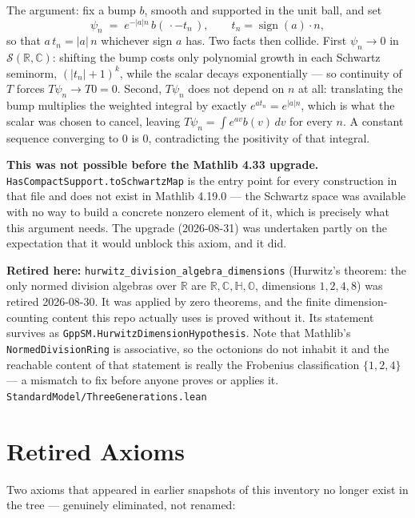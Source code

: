 \documentclass{report}
\theoremstyle{definition}
\begin{document}
\begin{itemize}
\begin{itemize}
The argument: fix a bump $b$, smooth and supported in the unit ball, and set
\[
  \psi_n \;=\; e^{-|a|n}\, b(\,\cdot - t_n\,), \qquad t_n = \operatorname{sign}(a)\cdot n,
\]
so that $a\,t_n = |a|\,n$ whichever sign $a$ has. Two facts then collide. First
$\psi_n \to 0$ in $\mathcal{S}(\mathbb{R},\mathbb{C})$: shifting the bump costs only
polynomial growth in each Schwartz seminorm, $(|t_n|+1)^k$, while the scalar decays
exponentially --- so continuity of $T$ forces $T\psi_n \to T0 = 0$. Second, $T\psi_n$ does
not depend on $n$ at all: translating the bump multiplies the weighted integral by exactly
$e^{a t_n} = e^{|a|n}$, which is what the scalar was chosen to cancel, leaving
$T\psi_n = \int e^{av}b(v)\,dv$ for every $n$. A constant sequence converging to $0$ is
$0$, contradicting the positivity of that integral.

\medskip
\noindent\textbf{This was not possible before the Mathlib 4.33 upgrade.}
\texttt{HasCompactSupport.toSchwartzMap} is the entry point for every construction in that
file and does not exist in Mathlib 4.19.0 --- the Schwartz space was available with no way
to build a concrete nonzero element of it, which is precisely what this argument needs. The
upgrade (2026-08-31) was undertaken partly on the expectation that it would unblock this
axiom, and it did.

\noindent\textbf{Retired here:} \texttt{hurwitz\_division\_algebra\_dimensions} (Hurwitz's
theorem: the only normed division algebras over $\mathbb{R}$ are
$\mathbb{R},\mathbb{C},\mathbb{H},\mathbb{O}$, dimensions $1,2,4,8$) was retired 2026-08-30.
It was applied by zero theorems, and the finite dimension-counting content this repo actually
uses is proved without it. Its statement survives as
\texttt{GppSM.HurwitzDimensionHypothesis}. Note that Mathlib's \texttt{NormedDivisionRing} is
associative, so the octonions do not inhabit it and the reachable content of that statement is
really the Frobenius classification $\{1,2,4\}$ --- a mismatch to fix before anyone proves or
applies it. \hfill \texttt{StandardModel/ThreeGenerations.lean}

\section{Retired Axioms}

Two axioms that appeared in earlier snapshots of this inventory no longer exist in the
tree --- genuinely eliminated, not renamed:


\end{itemize}
\end{itemize}
\end{document}

